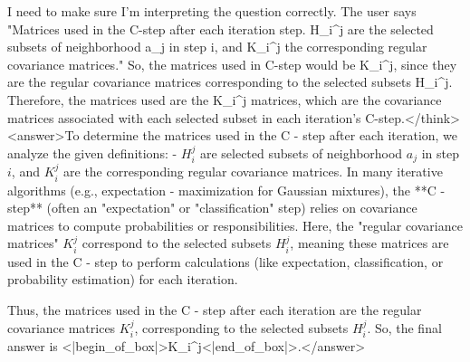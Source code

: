 I need to make sure I'm interpreting the question correctly. The user says "Matrices used in the C-step after each iteration step. H_i^j are the selected subsets of neighborhood a_j in step i, and K_i^j the corresponding regular covariance matrices." So, the matrices used in C-step would be K_i^j, since they are the regular covariance matrices corresponding to the selected subsets H_i^j. Therefore, the matrices used are the K_i^j matrices, which are the covariance matrices associated with each selected subset in each iteration's C-step.</think><answer>To determine the matrices used in the C - step after each iteration, we analyze the given definitions:  
- \( H_i^j \) are selected subsets of neighborhood \( a_j \) in step \( i \), and \( K_i^j \) are the corresponding regular covariance matrices.  
In many iterative algorithms (e.g., expectation - maximization for Gaussian mixtures), the **C - step** (often an "expectation" or "classification" step) relies on covariance matrices to compute probabilities or responsibilities. Here, the "regular covariance matrices" \( K_i^j \) correspond to the selected subsets \( H_i^j \), meaning these matrices are used in the C - step to perform calculations (like expectation, classification, or probability estimation) for each iteration.  

Thus, the matrices used in the C - step after each iteration are the regular covariance matrices \( K_i^j \), corresponding to the selected subsets \( H_i^j \).  
So, the final answer is <|begin_of_box|>K_i^j<|end_of_box|>.</answer>